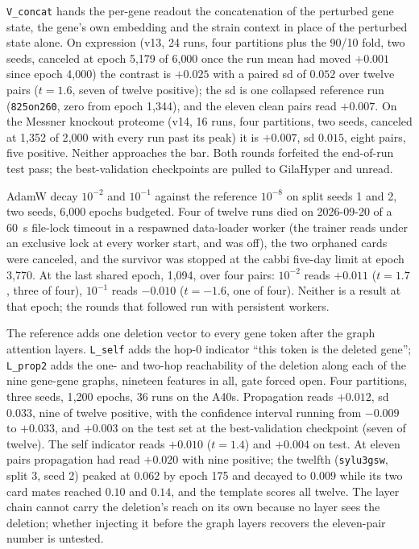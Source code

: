  \texttt{V\_concat}
hands the per-gene readout the concatenation of the perturbed gene state, the gene's own
embedding and the strain context in place of the perturbed state alone. On expression
(v13, 24 runs, four partitions plus the 90/10 fold, two seeds, canceled at epoch
5{,}179 of 6{,}000 once the run mean had moved $+0.001$ since epoch 4{,}000) the contrast
is $+0.025$ with a paired sd of $0.052$ over twelve pairs ($t = 1.6$, seven of twelve
positive); the sd is one collapsed reference run (\texttt{825on260}, zero from epoch
1{,}344), and the eleven clean pairs read $+0.007$. On the Messner knockout proteome (v14,
16 runs, four partitions, two seeds, canceled at 1{,}352 of 2{,}000 with every run past
its peak) it is $+0.007$, sd $0.015$, eight pairs, five positive. Neither approaches the
bar. Both rounds forfeited the end-of-run test pass; the best-validation checkpoints are
pulled to GilaHyper and unread.

 AdamW decay $10^{-2}$ and
$10^{-1}$ against the reference $10^{-8}$ on split seeds 1 and 2, two seeds, 6{,}000
epochs budgeted. Four of twelve runs died on 2026-09-20 of a 60~s file-lock timeout in a
respawned data-loader worker (the trainer reads  under an
exclusive lock at every worker start, and  was off), the two
orphaned cards were canceled, and the survivor was stopped at the cabbi five-day limit at
epoch 3{,}770. At the last shared epoch, 1{,}094, over four pairs: $10^{-2}$ reads
$+0.011$ ($t = 1.7$, three of four), $10^{-1}$ reads $-0.010$ ($t = -1.6$, one of four).
Neither is a result at that epoch; the rounds that followed run with persistent workers.

 The reference adds one
deletion vector to every gene token after the graph attention layers. \texttt{L\_self} adds
the hop-0 indicator ``this token is the deleted gene''; \texttt{L\_prop2} adds the one- and
two-hop reachability of the deletion along each of the nine gene-gene graphs, nineteen
features in all, gate forced open. Four partitions, three seeds, 1{,}200 epochs, 36 runs
on the A40s. Propagation reads $+0.012$, sd $0.033$, nine of twelve positive, with the
confidence interval running from $-0.009$ to $+0.033$, and $+0.003$ on the test set at the
best-validation checkpoint (seven of twelve). The self indicator reads $+0.010$ ($t = 1.4$)
and $+0.004$ on test. At eleven pairs propagation had read $+0.020$ with nine positive; the
twelfth (\texttt{sylu3gsw}, split 3, seed 2) peaked at $0.062$ by epoch 175 and decayed to
$0.009$ while its two card mates reached $0.10$ and $0.14$, and the template scores all
twelve. The layer chain cannot carry the deletion's reach on its own because no layer
sees the deletion; whether injecting it before the graph layers recovers the eleven-pair
number is untested.

